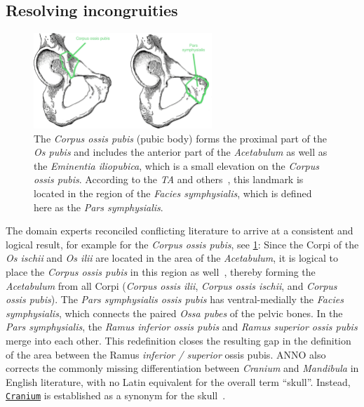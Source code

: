 \documentclass[sw]{iosart2x}
\newcommand{\anno}[1]{\href{https://annosaxfdm.de/ontology/#1}{\texttt{#1}}}
\begin{document}

\subsection{Resolving incongruities}

\begin{figure}[h]
\centering
\includegraphics[width=0.6\textwidth]{img/corpus_ossis_pubis.png}
\caption{The \emph{Corpus ossis pubis} (pubic body) forms the proximal part of the \emph{Os pubis} and includes the anterior part of the \emph{Acetabulum} as well as the \emph{Eminentia iliopubica}, which is a small elevation on the \emph{Corpus ossis pubis}.
According to the \emph{TA} and others~\citep{ta2,schemamann,anatomylexicon2007,drake2019gray,anatomylexicon,prometheus2,anatomie}, this landmark is located in the region of the \emph{Facies symphysialis}, which is defined here as the \emph{Pars symphysialis}.
}\label{fig:corpusossispubis}
\end{figure}


The domain experts reconciled conflicting literature to arrive at a consistent and logical result, for example for the \emph{Corpus ossis pubis}, see \cref{fig:corpusossispubis}:
Since the Corpi of the \emph{Os ischii} and \emph{Os ilii} are located in the area of the \emph{Acetabulum},
it is logical to place the \emph{Corpus ossis pubis} in this region as well~\citep{graysanatomy,waldeyer,allgemeineanatomie,datacollection2,romanianmandible}, thereby forming the \emph{Acetabulum} from all Corpi (\emph{Corpus ossis ilii}, \emph{Corpus ossis ischii}, and \emph{Corpus ossis pubis}).
The \emph{Pars symphysialis ossis pubis} has ventral-medially the \emph{Facies symphysialis}, which connects the paired \emph{Ossa pubes} of the pelvic bones.
In the \emph{Pars symphysialis}, the \emph{Ramus inferior ossis pubis} and \emph{Ramus superior ossis pubis} merge into each other.
This redefinition closes the resulting gap in the definition of the area between the Ramus \emph{inferior / superior} ossis pubis.
%
ANNO also corrects the commonly missing differentiation between \emph{Cranium} and \emph{Mandibula} in English literature, with no Latin equivalent for the overall term \enquote{skull}.
Instead, \anno{Cranium} is established as a synonym for the skull~\citep{allgemeineanatomieen,prometheus2}.
\end{document}
